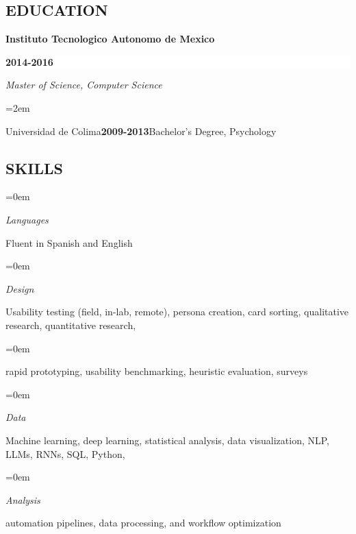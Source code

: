\documentclass[paper=letter,fontsize=10.4pt]{scrartcl} %
\newlength{\spacebox}
\newcommand{\NewPart}[1]{\subsection*{\uppercase{#1}}}
\newcommand{\PersonalEntry}[2]{
		\noindent\hangindent=2em\hangafter=0 %
		\parbox{\spacebox}{        %
		\textit{#1}}		       %
		\hspace{1.5em} #2 \par}    %
\newcommand{\SkillsEntry}[2]{      %
		\noindent\hangindent=0em\hangafter=0 %
		\parbox{\spacebox}{        %
		\textit{#1}}			   %
		\hspace{1.75em} #2 \par}    %
\newcommand{\EducationEntry}[5]{
		\noindent \textbf{#1} \hfill      %
		\colorbox{White}{%
			\parbox{10em}{%
            \hfill\color{Black}#2}} \par  %
		\noindent \textit{#3} \par        %
		\noindent\hangindent=2em\hangafter=0 \small #4 %
		\normalsize \par}
\begin{document}
\NewPart{Education}{}

\EducationEntry{Instituto Tecnologico Autonomo de Mexico}{\textbf{2014-2016}}{Master of Science, Computer Science}{}


\EducationEntry{Universidad de Colima}{\textbf{2009-2013}}{Bachelor's Degree, Psychology}{}


\NewPart{Skills}{}

\SkillsEntry{Languages}{Fluent in Spanish and English}

\SkillsEntry{Design} {Usability testing (field, in-lab, remote), persona creation, card sorting, qualitative research, quantitative research,}
\SkillsEntry{} {rapid prototyping, usability benchmarking, heuristic evaluation, surveys}


\SkillsEntry{Data}{Machine learning, deep learning, statistical analysis, data visualization, NLP, LLMs, RNNs, SQL, Python,}
\SkillsEntry{Analysis}{automation pipelines, data processing, and workflow optimization}

\end{document}
